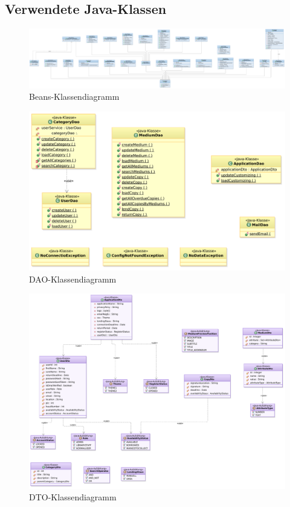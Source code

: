 \documentclass{article}
\begin{document}
\subsection{Verwendete Java-Klassen}

\begin{figure}[H]
    \includegraphics[scale=0.17]{Beansdiagramm.pdf}
    \caption{Beans-Klassendiagramm}
    \label{fig:UML-Klassendkígrramm}
\end{figure}


    \begin{figure}[H]
	\hypertarget{DAO}{}
    \includegraphics[scale=0.4]{Daodiagramm.pdf}
    \caption{DAO-Klassendiagramm}
    \label{fig:UML-Klassendkígrramm}
\end{figure}

\begin{figure}[H]
    \includegraphics[scale=0.4]{Dtodiagramm.pdf}
    \caption{DTO-Klassendiagramm}
    \label{fig:UML-Klassendkígrramm}
\end{figure}
\end{document}
